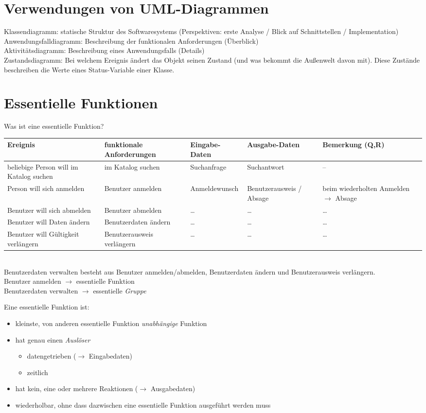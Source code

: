 \documentclass{scrreprt}
\begin{document}
\section{Verwendungen von UML-Diagrammen}
Klassendiagramm: statische Struktur des Softwaresystems (Perspektiven: erste Analyse / Blick auf Schnittstellen / Implementation)\\
Anwendungsfalldiagramm: Beschreibung der funktionalen Anforderungen (Überblick)\\
Aktivitätsdiagramm: Beschreibung eines Anwendungsfalls (Details)\\
Zustandsdiagramm: Bei welchem Ereignis ändert das Objekt seinen Zustand (und was bekommt die Außenwelt davon mit). Diese Zustände beschreiben die Werte eines Status-Variable einer Klasse.

\section{Essentielle Funktionen}
Was ist eine essentielle Funktion?\\
\begin{tabular}{L{.2} | L{.2} | L{.15} | L{.15} | L{.25}}
Ereignis & funktionale Anforderungen & Eingabe-Daten & Ausgabe-Daten &Bemerkung (Q,R)\\
\hline\hline
beliebige Person will im Katalog suchen & im Katalog suchen & Suchanfrage & Suchantwort & --\\\hline
Person will sich anmelden & Benutzer anmelden & Anmeldewunsch & Benutzerausweis / Absage & beim wiederholten Anmelden $\to$ Absage\\\hline
Benutzer will sich abmelden & Benutzer abmelden & … & … & …\\\hline
Benutzer will Daten ändern & Benutzerdaten ändern & … & … & …\\\hline
Benutzer will Gültigkeit verlängern & Benutzerausweis verlängern & … & … & …
\end{tabular}\\
Benutzerdaten verwalten besteht aus Benutzer anmelden/abmelden, Benutzerdaten ändern und Benutzerausweis verlängern.\\
Benutzer anmelden $\to$ essentielle Funktion\\
Benutzerdaten verwalten $\to$ essentielle \emph{Gruppe}\\\bigskip

Eine essentielle Funktion ist:
\begin{itemize}
\item kleinste, von anderen essentielle Funktion \emph{unabhängige} Funktion
\item hat genau einen \emph{Auslöser}
\begin{itemize}
\item datengetrieben ($\to$ Eingabedaten)
\item zeitlich
\end{itemize}
\item hat kein, eine oder mehrere Reaktionen ($\to$ Ausgabedaten)
\item wiederholbar, ohne dass dazwischen eine essentielle Funktion ausgeführt werden muss
\end{itemize}
\end{document}
